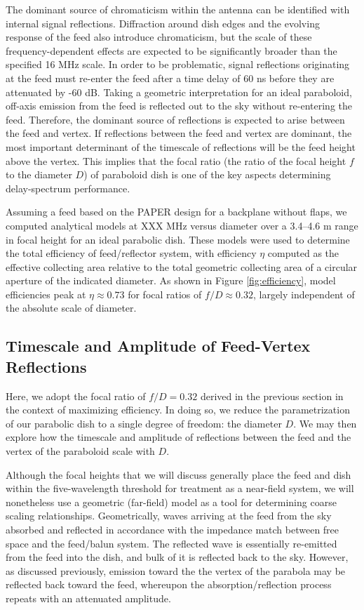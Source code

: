 \documentclass[11pt]{article}
\begin{document}
The dominant source of chromaticism within the
antenna can be identified with internal signal reflections.  Diffraction around dish
edges and the evolving response of the feed also introduce chromaticism, but the
scale of these frequency-dependent effects are expected to be significantly broader
than the specified 16 MHz scale.  
In order to be problematic, signal reflections originating at the feed must re-enter
the feed after a time delay of 60 ns before they are attenuated by -60 dB.
Taking a geometric interpretation for an ideal paraboloid, 
off-axis emission from the feed is
reflected out to the sky without re-entering the feed.
Therefore, the dominant source of reflections is expected to arise between the feed and vertex.
If reflections between the feed and vertex are dominant, the most important determinant
of the timescale of reflections will be the feed height above the vertex.  This 
implies that the focal ratio (the ratio of the focal height $f$ to the diameter $D$)
of paraboloid dish is one of the key aspects 
determining delay-spectrum performance.

Assuming a feed based on the PAPER design for a backplane without flaps,
we computed analytical models at XXX MHz versus diameter over a 3.4--4.6 m range in focal height
for an ideal parabolic dish.  These models were used to determine the total efficiency of
feed/reflector system, with efficiency $\eta$ computed as the effective collecting area
relative to the total geometric collecting area of a circular aperture of the
indicated diameter.
As shown in Figure \ref{fig:efficiency},
model efficiencies peak at $\eta\approx0.73$ for focal ratios of $f/D\approx0.32$, largely
independent of the absolute scale of diameter.

\subsection{Timescale and Amplitude of Feed-Vertex Reflections}

Here, we adopt the focal ratio of $f/D=0.32$ derived in the previous section in
the context of maximizing efficiency.  In doing so, we reduce the parametrization of our parabolic
dish to a single degree of freedom: the diameter $D$.  We may then explore how the timescale
and amplitude of reflections between the feed and the vertex of the paraboloid scale with $D$.

Although the focal heights that we will discuss generally place the feed and dish within
the five-wavelength threshold for treatment as a near-field system, we will nonetheless
use a geometric (far-field) model as a tool for determining coarse scaling relationships.
Geometrically, waves arriving at the feed from the sky absorbed and reflected in accordance with
the impedance match between free space and the feed/balun system.  The reflected wave
is essentially re-emitted from the feed into the dish, and bulk of it is reflected back to the
sky.  However, as discussed previously, emission toward the the vertex of the parabola may be reflected
back toward the feed, whereupon the absorption/reflection process repeats with an attenuated amplitude.
\end{document}
